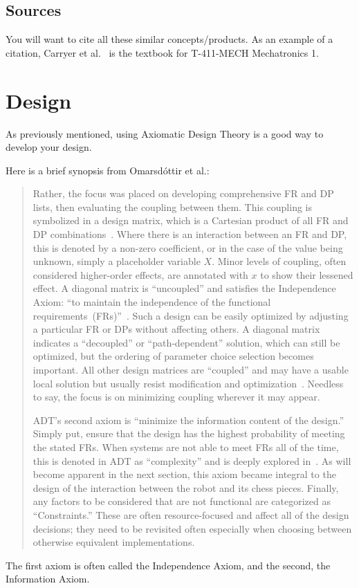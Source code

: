 \documentclass[draft]{rureport}
\begin{document}
\subsection*{Sources}
You will want to cite all these similar concepts/products.
As an example of a citation, Carryer et al.~\cite{carryer2011IntroMechatronics} is the textbook for T-411-MECH Mechatronics 1.


\section{Design}
As previously mentioned, using Axiomatic Design Theory is a good way to develop your design.

Here is a brief synopsis from Omarsdóttir et al.\cite{omarsdottir2016chessmate}:
\begin{quotation}
  Rather, the focus was placed on developing comprehensive FR and DP lists, then evaluating the coupling between them.
  This coupling is symbolized in a design matrix, which is a Cartesian product of all FR and DP combinations~\cite{cochran2016msdd, benevides2012aed}.
Where there is an interaction between an FR and DP, this is denoted by a non-zero coefficient, or in the case of the value being unknown, simply a placeholder variable $X$.
Minor levels of coupling, often considered higher-order effects, are annotated with $x$ to show their lessened effect.
A diagonal matrix is ``uncoupled'' and satisfies the Independence Axiom: ``to maintain the independence of the functional requirements~(FRs)''~\cite{suh2001axiomatic}.
Such a design can be easily optimized by adjusting a particular FR or DPs without affecting others.
A diagonal matrix indicates a ``decoupled'' or ``path-dependent'' solution, which can still be optimized, but the ordering of parameter choice selection becomes important.
All other design matrices are ``coupled'' and may have a usable local solution but usually resist modification and optimization~\cite{suh2001axiomatic}.
Needless to say, the focus is on minimizing coupling wherever it may appear.

ADT's second axiom is ``minimize the information content of the design.''
Simply put, ensure that the design has the highest probability of meeting the stated FRs.
When systems are not able to meet FRs all of the time, this is denoted in ADT as ``complexity'' and is deeply explored in~\cite{suh2005complexity}.
As will become apparent in the next section, this axiom became integral to the design of the interaction between the robot and its chess pieces.
Finally, any factors to be considered that are not functional are categorized as ``Constraints.''
These are often resource-focused and affect all of the design decisions; they need to be revisited often especially when choosing between otherwise equivalent implementations.
\end{quotation}
The first axiom is often called the Independence Axiom, and the second, the Information Axiom.
\end{document}
